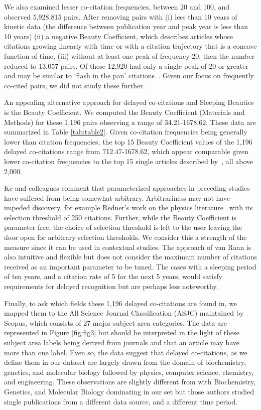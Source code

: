 \documentclass[utf8]{frontiersSCNS}
\begin{document}
We also examined lesser co-citation frequencies, between 20 and 100, and observed 5,928,815 pairs. After removing pairs with (i) less than 10 years of kinetic data (the difference between publication year and peak year is less than 10 years) (ii) a negative Beauty Coefficient, which describes articles whose citations growing linearly with time or with a citation trajectory that is a concave function of time, (iii) without at least one peak of frequency 20, then the number reduced to 13,057 pairs. Of these 12,920 had only a single peak of 20 or greater and may be similar to `flash in the pan' citations~\citep{costas2010,Li2014}. Given our focus on frequently co-cited pairs, we did not study these further.

An appealing alternative approach for delayed co-citations and Sleeping Beauties is the Beauty Coefficient. We computed the Beauty Coefficient (Materials and Methods) for these 1,196 pairs  observing a range of 34.21-1678.62. These data are summarized in Table \ref{tab:table2}.  Given co-citation frequencies being generally lower than citation frequencies, the top 15 Beauty Coefficient values of the 1,196 delayed co-citations range from 712.47-1678.62, which appear comparable given lower co-citation frequencies to the top 15 single articles described by~\citep{Ke2015}, all above 2,000.

Ke and colleagues comment that parameterized approaches in preceding studies have suffered from being somewhat arbitrary. Arbitrariness may not have impeded discovery, for example Redner's work on the physics literature~\citep{redner_2005} with its selection threshold of 250 citations. Further, while the Beauty Coefficient is parameter free, the choice of selection threshold is left to the user leaving the door open for arbitrary selection thresholds. We consider this a strength of the measure since it can be used in contextual studies. The approach of van Raan is also intuitive and flexible but does not consider the maximum number of citations received as an important parameter to be tuned.  The cases with a sleeping period of ten years, and a citation rate of 5 for the next 5 years, would satisfy requirements for delayed recognition but are perhaps less noteworthy.

Finally, to ask which fields these 1,196 delayed co-citations are found in, we mapped them to the All Science Journal Classification (ASJC) maintained by Scopus, which consists of 27 major subject area categories.  The data are represented in Figure \ref{fig:fig3} but should be interpreted in the light of these subject area labels being derived from journals and that an article may have more than one label. Even so, the data suggest that delayed co-citations, as we define them in our dataset are largely drawn from the domain of biochemistry, genetics, and molecular biology followed by physics, computer science, chemistry, and engineering. These observations are slightly different from \cite[Fig~4]{Ke2015} with Biochemistry, Genetics, and Molecular Biology dominating in our set but those authors studied single publications from a different data source, and a different time period. 
\end{document}
